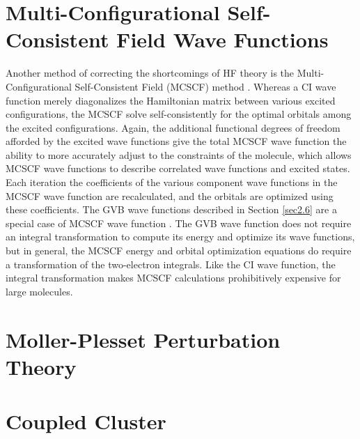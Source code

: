 \section{Multi-Configurational Self-Consistent Field Wave Functions}
\label{sec2.9}
Another method of correcting the shortcomings of HF theory is the
Multi-Configurational Self-Consistent Field (MCSCF) method
\cite{Szabo82,Yaffe76}. Whereas a CI wave function merely
diagonalizes the Hamiltonian matrix between various excited
configurations, the MCSCF solve self-consistently for the optimal
orbitals among the excited configurations. Again, the additional
functional degrees of freedom afforded by the excited wave functions
give the total MCSCF wave function the ability to more accurately
adjust to the constraints of the molecule, which allows MCSCF wave
functions to describe correlated wave functions and excited states.
Each iteration the coefficients of the various component wave
functions in the MCSCF wave function are recalculated, and the
orbitals are optimized using these coefficients. The GVB wave
functions described in Section \ref{sec2.6} are a special case of
MCSCF wave function \cite{Bobrowicz77}. The GVB wave function does not
require an integral transformation to compute its energy and optimize
its wave functions, but in general, the MCSCF energy and orbital
optimization equations do require a transformation of the two-electron
integrals. Like the CI wave function, the integral transformation
makes MCSCF calculations prohibitively expensive for large molecules.

\section{Moller-Plesset Perturbation Theory}

\section{Coupled Cluster}
